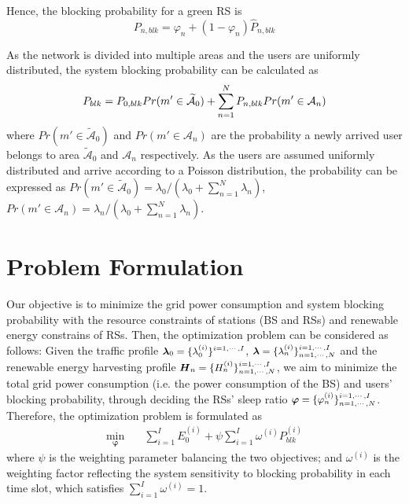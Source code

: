 \documentclass[conference]{IEEEtran}
\begin{document}
  Hence, the blocking probability for a green RS is
  \begin{equation}\label{equ:blocking probability of RS}
  P_{n,blk}= \varphi_n+(1-\varphi_n)\widehat{P}_{n,blk}
  \end{equation}

  As the network is divided into multiple areas and the users are uniformly distributed, the system blocking probability can be calculated as
  \begin{equation}\label{equ:system blocking probability}
  \small{P_{blk} = P_{0,blk}Pr(m'\in\widetilde{\mathcal{A}}_0)+\sum\limits_{n=1}^NP_{n,blk}Pr(m'\in\mathcal{A}_n)}
  \end{equation}
  where $Pr(m'\in\widetilde{\mathcal{A}}_0)$ and $Pr(m'\in\mathcal{A}_n)$ are the probability a newly arrived user belongs to area $\widetilde{\mathcal{A}}_0$ and $\mathcal{A}_n$ respectively. As the users are assumed uniformly distributed and arrive according to a Poisson distribution, the probability can be expressed as $Pr(m'\in\widetilde{\mathcal{A}}_0)=\lambda_0/(\lambda_0+\sum\limits_{n=1}^N\lambda_n)$, $Pr(m'\in\mathcal{A}_n)=\lambda_n/(\lambda_0+\sum\limits_{n=1}^N\lambda_n)$.


 \section{Problem Formulation}\label{sec:formulation}
 Our objective is to minimize the grid power consumption and system blocking probability with the resource constraints of stations (BS and RSs) and renewable energy constrains of RSs.
Then, the optimization problem can be considered as follows: Given the traffic profile $\small{\boldsymbol{\lambda}_0 = \{\lambda_0^{(i)}\}^{i=1,\cdots,I}}$, $\small{\boldsymbol{\lambda} = \{\lambda_n^{(i)}\}^{i=1,\cdots,I}_{n=1,\cdots,N}}$ and the renewable energy harvesting profile $\small{\boldsymbol{H}_n = \{H_n^{(i)}\}^{i=1,\cdots,I}_{n=1,\cdots,N}}$, we aim to minimize the total grid power consumption (i.e. the power consumption of the BS) and users' blocking probability, through deciding the RSs' sleep ratio $\small{\boldsymbol{\varphi} = \{\varphi_n^{(i)}\}^{i=1,\cdots,I}_{n=1,\cdots,N}}$. Therefore, the optimization problem is formulated as
 \begin{align}
  \min\limits_{\boldsymbol{\varphi}} \quad & \sum_{i=1}^IE_0^{(i)}+\psi\sum_{i=1}^I\omega^{(i)}P_{blk}^{(i)}\label{equ:original}
 \end{align}
 where $\psi$ is the weighting parameter balancing the two objectives; and $\omega^{(i)}$ is the weighting factor reflecting the system sensitivity to blocking probability in each time slot, which satisfies $\sum_{i=1}^I\omega^{(i)}=1$.
\end{document}
